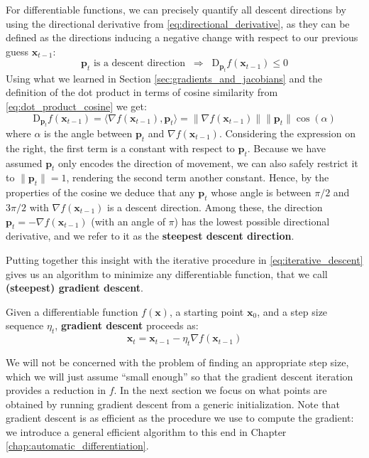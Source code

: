 For differentiable functions, we can precisely quantify all descent directions by using the directional derivative from \eqref{eq:directional_derivative}, as they can be defined as the directions inducing a negative change with respect to our previous guess $\mathbf{x}_{t-1}$:
%
$$
\mathbf{p}_t \text{ is a descent direction} \;\;\Rightarrow\;\; \mathrm{D}_{\mathbf{p}_t} f(\mathbf{x}_{t-1}) \le 0
$$
%
Using what we learned in Section \ref{sec:gradients_and_jacobians} and the definition of the dot product in terms of cosine similarity from \eqref{eq:dot_product_cosine} we get:
%
$$
\mathrm{D}_{\mathbf{p}_t} f(\mathbf{x}_{t-1})=\langle \nabla f(\mathbf{x}_{t-1}), \mathbf{p}_t\rangle=\lVert\nabla f(\mathbf{x}_{t-1})\rVert \lVert\mathbf{p}_t\rVert \cos(\alpha)
$$
%
where $\alpha$ is the angle between $\mathbf{p}_t$ and $\nabla f(\mathbf{x}_{t-1})$. Considering the expression on the right, the first term is a constant with respect to $\mathbf{p}_t$. Because we have assumed $\mathbf{p}_t$ only encodes the direction of movement, we can also safely restrict it to $\lVert\mathbf{p}_t\rVert = 1$, rendering the second term another constant. Hence, by the properties of the cosine we deduce that any $\mathbf{p}_t$ whose angle is between $\pi/2$ and $3\pi/2$ with $\nabla f(\mathbf{x}_{t-1})$ is a descent direction. Among these, the direction $\mathbf{p}_t = -\nabla f(\mathbf{x}_{t-1})$ (with an angle of $\pi$) has the lowest possible directional derivative, and we refer to it as the \textbf{steepest descent direction}. 

Putting together this insight with the iterative procedure in \eqref{eq:iterative_descent} gives us an algorithm to minimize any differentiable function, that we call \textbf{(steepest) gradient descent}.

\begin{definition} \addbottle
Given a differentiable function $f(\mathbf{x})$, a starting point $\mathbf{x}_0$, and a step size sequence $\eta_t$, \textbf{gradient descent} proceeds as:
%
\begin{equation}
\mathbf{x}_{t}=\mathbf{x}_{t-1}-\eta_t\nabla f(\mathbf{x}_{t-1})
\label{eq:gradient_descent}
\end{equation}
\end{definition}

We will not be concerned with the problem of finding an appropriate step size, which we will just assume “small enough” so that the gradient descent iteration provides a reduction in $f$. In the next section we focus on what points are obtained by running gradient descent from a generic initialization. Note that gradient descent is as efficient as the procedure we use to compute the gradient: we introduce a general efficient algorithm to this end in Chapter \ref{chap:automatic_differentiation}.

